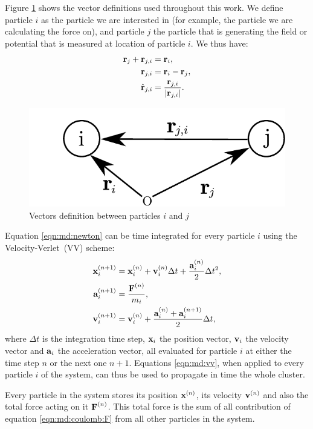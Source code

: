 Figure
\ref{fig:md:vectors} shows the vector definitions used throughout this work. We
define particle $i$ as the particle we are interested in (for example, the
particle we are calculating the force on), and particle $j$ the particle that
is generating the field or potential that is measured at location of particle
$i$. We thus have:
\begin{align}
\textbf{r}_{j} + \textbf{r}_{j,i} & = \textbf{r}_{i}, \\
\textbf{r}_{j,i} & = \textbf{r}_{i} - \textbf{r}_{j}, \\
\hat{\textbf{r}}_{j,i} & = \frac{\textbf{r}_{j,i}}{\left| \textbf{r}_{j,i} \right|}.
\end{align}
%
\begin{figure}
 \centering
 \includegraphics[width=0.5\columnwidth]{figures/vectors}
 \caption{\label{fig:md:vectors}Vectors definition between particles $i$ and $j$}
\end{figure}
%
%
Equation \eqref{eqn:md:newton} can be time integrated for every particle
$i$ using the Velocity-Verlet~(VV) scheme:
\begin{subequations}
\label{eqn:md:vv}
\begin{align}
\textbf{x}_{i}^{\left( n+1 \right)} & = \textbf{x}_{i}^{\left( n \right)} + \textbf{v}_{i}^{\left( n \right)} \Delta t +
\frac{\textbf{a}_{i}^{\left( n \right)}}{2} \Delta t^2, \\
\textbf{a}_{i}^{\left( n+1 \right)} & = \frac{\textbf{F}^{\left( n \right)}}{m_i}, \label{eqn:md:vv:a} \\
\textbf{v}_{i}^{\left( n+1 \right)} & = \textbf{v}_{i}^{\left( n \right)} + \frac{\textbf{a}_{i}^{\left( n \right)} +
\textbf{a}_{i}^{\left( n+1 \right)}}{2} \Delta t,
\end{align}
\end{subequations}
where $\Delta t$ is the integration time step, $\textbf{x}_{i}$ the position vector,
$\textbf{v}_{i}$ the velocity vector and $\textbf{a}_{i}$ the acceleration vector, all evaluated
for particle $i$ at either the time step $n$ or the next one $n+1$.
Equations \eqref{eqn:md:vv}, when applied to every particle $i$ of the system,
can thus be used to propagate in time the whole cluster.

Every particle in the system stores its position $\textbf{x}^{\left( n \right)}$, its velocity
$\textbf{v}^{\left( n \right)}$ and also the total force acting on it $\textbf{F}^{\left( n \right)}$. This total
force is the sum of all contribution of equation \eqref{eqn:md:coulomb:F} from
all other particles in the system.

